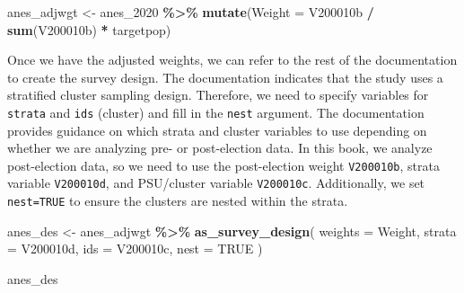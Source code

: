 \documentclass[
]{krantz}
\makeatletter
\newenvironment{Shaded}{\begin{snugshade}}{\end{snugshade}}
\newcommand{\AttributeTok}[1]{\textcolor[rgb]{0.27,0.27,0.27}{#1}}
\newcommand{\ConstantTok}[1]{\textcolor[rgb]{0.37,0.37,0.37}{#1}}
\newcommand{\FunctionTok}[1]{\textcolor[rgb]{0.27,0.27,0.27}{\textbf{#1}}}
\newcommand{\NormalTok}[1]{#1}
\newcommand{\OtherTok}[1]{\textcolor[rgb]{0.37,0.37,0.37}{#1}}
\newcommand{\SpecialCharTok}[1]{\textcolor[rgb]{0.43,0.43,0.43}{\textbf{#1}}}
\newenvironment{kframe}{%
\medskip{}
\setlength{\fboxsep}{.8em}
 \def\at@end@of@kframe{}%
 \ifinner\ifhmode%
  \def\at@end@of@kframe{\end{minipage}}%
  \begin{minipage}{\columnwidth}%
 \fi\fi%
 \def\FrameCommand##1{\hskip\@totalleftmargin \hskip-\fboxsep
 \colorbox{shadecolor}{##1}\hskip-\fboxsep
     \hskip-\linewidth \hskip-\@totalleftmargin \hskip\columnwidth}%
 \MakeFramed {\advance\hsize-\width
   \@totalleftmargin\z@ \linewidth\hsize
   \@setminipage}}%
 {\par\unskip\endMakeFramed%
 \at@end@of@kframe}
\renewenvironment{Shaded}{\begin{kframe}}{\end{kframe}}
\makeatother
\begin{document}
\begin{Shaded}
\begin{Highlighting}[]
\NormalTok{anes\_adjwgt }\OtherTok{\textless{}{-}}\NormalTok{ anes\_2020 }\SpecialCharTok{\%\textgreater{}\%}
  \FunctionTok{mutate}\NormalTok{(}\AttributeTok{Weight =}\NormalTok{ V200010b }\SpecialCharTok{/} \FunctionTok{sum}\NormalTok{(V200010b) }\SpecialCharTok{*}\NormalTok{ targetpop)}
\end{Highlighting}
\end{Shaded}

Once we have the adjusted weights, we can refer to the rest of the documentation to create the survey design. The documentation indicates that the study uses a stratified cluster sampling design. Therefore, we need to specify variables for \texttt{strata} and \texttt{ids} (cluster) and fill in the \texttt{nest} argument. The documentation provides guidance on which strata and cluster variables to use depending on whether we are analyzing pre- or post-election data. In this book, we analyze post-election data, so we need to use the post-election weight \texttt{V200010b}, strata variable \texttt{V200010d}, and PSU/cluster variable \texttt{V200010c}. Additionally, we set \texttt{nest=TRUE} to ensure the clusters are nested within the strata.

\begin{Shaded}
\begin{Highlighting}[]
\NormalTok{anes\_des }\OtherTok{\textless{}{-}}\NormalTok{ anes\_adjwgt }\SpecialCharTok{\%\textgreater{}\%}
  \FunctionTok{as\_survey\_design}\NormalTok{(}
    \AttributeTok{weights =}\NormalTok{ Weight,}
    \AttributeTok{strata =}\NormalTok{ V200010d,}
    \AttributeTok{ids =}\NormalTok{ V200010c,}
    \AttributeTok{nest =} \ConstantTok{TRUE}
\NormalTok{  )}

\NormalTok{anes\_des}
\end{Highlighting}
\end{Shaded}
\end{document}
